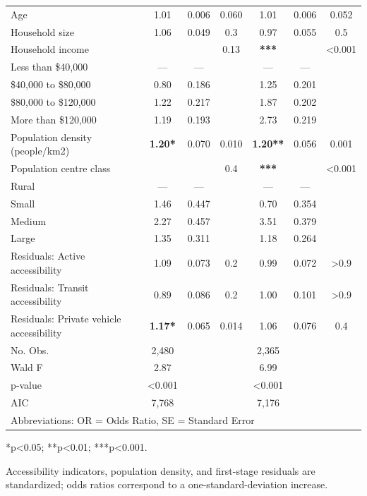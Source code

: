\documentclass[preprint, 3p,
authoryear]{elsarticle} %
\begin{document}
\begin{table}
\begin{threeparttable}
\begin{tabular}[t]{lcccccc}
Age & 1.01 & 0.006 & 0.060 & 1.01 & 0.006 & 0.052\\
\addlinespace
Household size & 1.06 & 0.049 & 0.3 & 0.97 & 0.055 & 0.5\\
Household income &  &  & 0.13 & \textbf{***} &  & <0.001\\
\hspace{1em}Less than \$40,000 & — & — &  & — & — & \\
\hspace{1em}\$40,000 to \$80,000 & 0.80 & 0.186 &  & 1.25 & 0.201 & \\
\hspace{1em}\$80,000 to \$120,000 & 1.22 & 0.217 &  & 1.87 & 0.202 & \\
\addlinespace
\hspace{1em}More than \$120,000 & 1.19 & 0.193 &  & 2.73 & 0.219 & \\
Population density (people/km2) & \textbf{1.20*} & 0.070 & 0.010 & \textbf{1.20**} & 0.056 & 0.001\\
Population centre class &  &  & 0.4 & \textbf{***} &  & <0.001\\
\hspace{1em}Rural & — & — &  & — & — & \\
\hspace{1em}Small & 1.46 & 0.447 &  & 0.70 & 0.354 & \\
\addlinespace
\hspace{1em}Medium & 2.27 & 0.457 &  & 3.51 & 0.379 & \\
\hspace{1em}Large & 1.35 & 0.311 &  & 1.18 & 0.264 & \\
Residuals: Active accessibility & 1.09 & 0.073 & 0.2 & 0.99 & 0.072 & >0.9\\
Residuals: Transit accessibility & 0.89 & 0.086 & 0.2 & 1.00 & 0.101 & >0.9\\
Residuals: Private vehicle accessibility & \textbf{1.17*} & 0.065 & 0.014 & 1.06 & 0.076 & 0.4\\
\midrule
\addlinespace
No. Obs. & 2,480 &  &  & 2,365 &  & \\
Wald F & 2.87 &  &  & 6.99 &  & \\
p‑value & <0.001 &  &  & <0.001 &  & \\
AIC & 7,768 &  &  & 7,176 &  & \\
\bottomrule
\multicolumn{7}{l}{\rule{0pt}{1em}Abbreviations: OR = Odds Ratio, SE = Standard Error}\\
\end{tabular}
\begin{tablenotes}
\small
\item [] *p<0.05; **p<0.01; ***p<0.001.
\item [] 
Accessibility indicators, population density, and first-stage residuals are standardized; odds ratios correspond to a one-standard-deviation increase.
\end{tablenotes}
\end{threeparttable}
\end{table}
\end{document}
